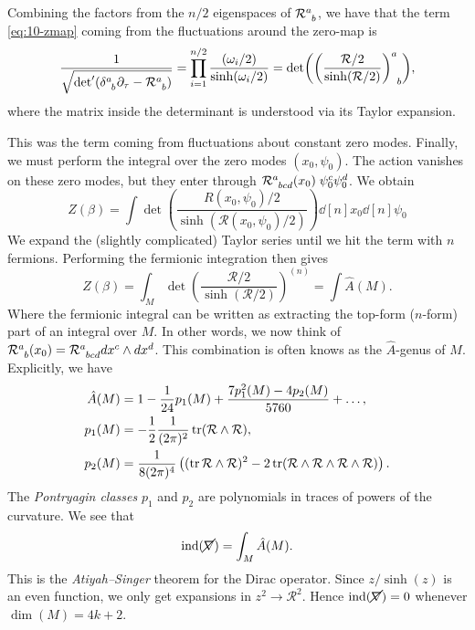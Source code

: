 Combining the factors from the $n / 2$ eigenspaces of $\mathcal{R}\indices{^{a}_{b}}$, we have that the term \eqref{eq:10-zmap} coming from the fluctuations around the zero-map is
\begin{equation}
  \frac{1}{\sqrt{\text{det}' (\delta\indices{^{a}_{b}} \partial_\tau - \mathcal{R}\indices{^{a}_{b}})}} = \prod_{i = 1}^{n / 2} \frac{(\omega_i / 2)}{\sinh (\omega_i / 2)} = \det( \left( \frac{\mathcal{R} / 2}{\sinh(\mathcal{R} / 2)} \right) \indices{^{a}_{b}}),
\end{equation}
where the matrix inside the determinant is understood via its Taylor expansion.

This was the term coming from fluctuations about constant zero modes. Finally, we must perform the integral over the zero modes $(x_0, \psi_0)$. The action vanishes on these zero modes, but they enter through $\mathcal{R}\indices{^{a}_{bcd}} (x_0)\; \psi_0^{c} \psi_0^{d}$. We obtain
\begin{equation}
  Z(\beta) = \int \det(\frac{R(x_0, \psi_0) / 2}{\sinh(\mathcal{R}(x_0, \psi_0) / 2)}) \dd[n]{x_0} \dd[n]{\psi_0}
\end{equation}
We expand the (slightly complicated) Taylor series until we hit the term with $n$ fermions.
Performing the fermionic integration then gives
\begin{equation}
  Z(\beta) = \int_M \det(\frac{\mathcal{R} / 2}{\sinh(\mathcal{R} / 2)})^{(n)} = \int \hat{A}(M).
\end{equation}
Where the fermionic integral can be written as extracting the top-form ($n$-form) part of an integral over $M$.
In other words, we now think of $\mathcal{R}\indices{^{a}_{b}}(x_0) = \mathcal{R}\indices{^{a}_{bcd}} dx^{c} \wedge dx^{d}$. This combination is often knows as the $\hat{A}$-genus of $M$.
Explicitly, we have
\begin{align}
  \hat{A}(M) &= 1 - \frac{1}{24} p_1 (M) + \frac{7 p_1^2(M) - 4 p_2(M)}{5760} + \dots , \\
  p_1(M) &= -\frac{1}{2} \frac{1}{(2 \pi)^2} \tr(\mathcal{R} \wedge \mathcal{R}), \\
  p_2(M) &= \frac{1}{8 (2 \pi)^4} \left( (\tr \mathcal{R} \wedge \mathcal{R})^2 - 2 \tr (\mathcal{R} \wedge \mathcal{R} \wedge \mathcal{R} \wedge \mathcal{R}) \right).
\end{align}
The \emph{Pontryagin classes} $p_1$ and $p_2$ are polynomials in traces of powers of the curvature.
We see that
\begin{equation}
  \text{ind}(\cancel{\nabla}) = \int_M \hat{A}(M).
\end{equation}
This is the \emph{Atiyah--Singer} theorem for the Dirac operator.
Since $z / \sinh(z)$ is an even function, we only get expansions in $z^2 \rightarrow \mathcal{R}^2$.
Hence $\text{ind}(\cancel{\nabla}) = 0$ whenever $\dim(M) = 4 k + 2$.

